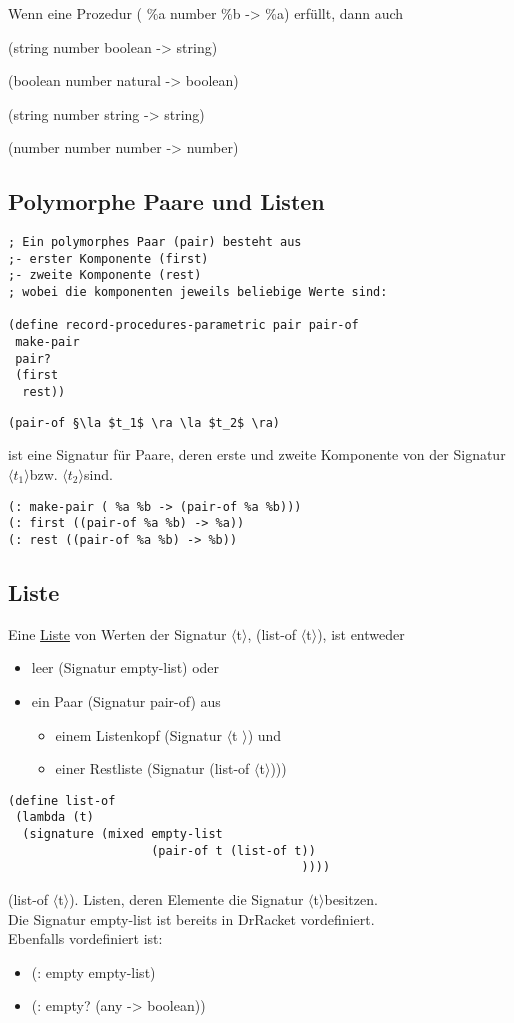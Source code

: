 \documentclass[a4paper,12pt]{article}
\newcommand{\la}{$\langle$}
\newcommand{\ra}{$\rangle$}
\begin{document}
Wenn eine Prozedur ( \%a number  \%b -> \%a) erfüllt, dann auch 

(string number boolean -> string)

(boolean number natural -> boolean)

(string number string -> string)

(number number number -> number)
\newpage
\subsection{Polymorphe Paare und Listen}
\begin{lstlisting}[style=customc]
; Ein polymorphes Paar (pair) besteht aus
;- erster Komponente (first)
;- zweite Komponente (rest)
; wobei die komponenten jeweils beliebige Werte sind:

(define record-procedures-parametric pair pair-of
 make-pair
 pair?
 (first
  rest))
\end{lstlisting}


\begin{lstlisting}
(pair-of §\la $t_1$ \ra \la $t_2$ \ra)
\end{lstlisting}
ist eine Signatur für Paare, deren erste und zweite Komponente von der Signatur \la $t_1$\ra bzw. \la $t_2$\ra sind.
\begin{lstlisting}[style=customc]
(: make-pair ( %a %b -> (pair-of %a %b)))
(: first ((pair-of %a %b) -> %a))
(: rest ((pair-of %a %b) -> %b))
\end{lstlisting}
\subsection{Liste}
Eine \uline{Liste} von Werten der Signatur \la t\ra, (list-of \la t\ra), ist entweder
\begin{itemize}
\item leer (Signatur empty-list) oder
\item ein Paar (Signatur pair-of) aus 
\begin{itemize}
\item einem Listenkopf (Signatur \la t \ra) und
\item einer Restliste (Signatur (list-of \la t\ra)))
\end{itemize}
\end{itemize}
\begin{lstlisting}[style=customc]
(define list-of
 (lambda (t)
  (signature (mixed empty-list
                    (pair-of t (list-of t))
                                         ))))
\end{lstlisting}
(list-of \la t\ra). Listen, deren Elemente die Signatur \la t\ra besitzen.\\
Die Signatur empty-list ist bereits in DrRacket vordefiniert. \\Ebenfalls vordefiniert ist:
\begin{itemize}[-]
\item (: empty empty-list)
\item (: empty? (any -> boolean))
\end{itemize}
\end{document}

